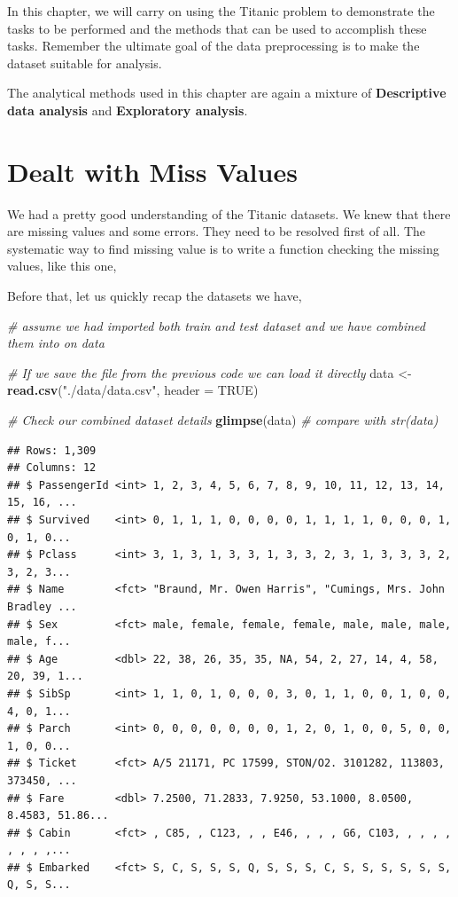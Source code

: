 \documentclass[
]{book}
\newenvironment{Shaded}{\begin{snugshade}}{\end{snugshade}}
\newcommand{\CommentTok}[1]{\textcolor[rgb]{0.56,0.35,0.01}{\textit{#1}}}
\newcommand{\DataTypeTok}[1]{\textcolor[rgb]{0.13,0.29,0.53}{#1}}
\newcommand{\KeywordTok}[1]{\textcolor[rgb]{0.13,0.29,0.53}{\textbf{#1}}}
\newcommand{\NormalTok}[1]{#1}
\newcommand{\OtherTok}[1]{\textcolor[rgb]{0.56,0.35,0.01}{#1}}
\newcommand{\StringTok}[1]{\textcolor[rgb]{0.31,0.60,0.02}{#1}}
\begin{document}
In this chapter, we will carry on using the Titanic problem to demonstrate the tasks to be performed and the methods that can be used to accomplish these tasks. Remember the ultimate goal of the data preprocessing is to make the dataset suitable for analysis.

The analytical methods used in this chapter are again a mixture of \textbf{Descriptive data analysis} and \textbf{Exploratory analysis}.

\hypertarget{dealt-with-miss-values}{%
\section{Dealt with Miss Values}\label{dealt-with-miss-values}}

We had a pretty good understanding of the Titanic datasets. We knew that there are missing values and some errors. They need to be resolved first of all. The systematic way to find missing value is to write a function checking the missing values, like this one,

Before that, let us quickly recap the datasets we have,

\begin{Shaded}
\begin{Highlighting}[]
\CommentTok{# assume we had imported both train and test dataset and we have combined them into on data}

\CommentTok{# If we save the file from the previous code we can load it directly}
\NormalTok{data <-}\StringTok{ }\KeywordTok{read.csv}\NormalTok{(}\StringTok{"./data/data.csv"}\NormalTok{, }\DataTypeTok{header =} \OtherTok{TRUE}\NormalTok{)}

\CommentTok{# Check our combined dataset details}
\KeywordTok{glimpse}\NormalTok{(data) }\CommentTok{# compare with str(data)}
\end{Highlighting}
\end{Shaded}

\begin{verbatim}
## Rows: 1,309
## Columns: 12
## $ PassengerId <int> 1, 2, 3, 4, 5, 6, 7, 8, 9, 10, 11, 12, 13, 14, 15, 16, ...
## $ Survived    <int> 0, 1, 1, 1, 0, 0, 0, 0, 1, 1, 1, 1, 0, 0, 0, 1, 0, 1, 0...
## $ Pclass      <int> 3, 1, 3, 1, 3, 3, 1, 3, 3, 2, 3, 1, 3, 3, 3, 2, 3, 2, 3...
## $ Name        <fct> "Braund, Mr. Owen Harris", "Cumings, Mrs. John Bradley ...
## $ Sex         <fct> male, female, female, female, male, male, male, male, f...
## $ Age         <dbl> 22, 38, 26, 35, 35, NA, 54, 2, 27, 14, 4, 58, 20, 39, 1...
## $ SibSp       <int> 1, 1, 0, 1, 0, 0, 0, 3, 0, 1, 1, 0, 0, 1, 0, 0, 4, 0, 1...
## $ Parch       <int> 0, 0, 0, 0, 0, 0, 0, 1, 2, 0, 1, 0, 0, 5, 0, 0, 1, 0, 0...
## $ Ticket      <fct> A/5 21171, PC 17599, STON/O2. 3101282, 113803, 373450, ...
## $ Fare        <dbl> 7.2500, 71.2833, 7.9250, 53.1000, 8.0500, 8.4583, 51.86...
## $ Cabin       <fct> , C85, , C123, , , E46, , , , G6, C103, , , , , , , , ,...
## $ Embarked    <fct> S, C, S, S, S, Q, S, S, S, C, S, S, S, S, S, S, Q, S, S...
\end{verbatim}
\end{document}

